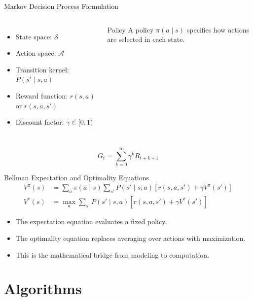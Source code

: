 \documentclass[aspectratio=169,11pt]{beamer}
\begin{document}
\begin{frame}{Markov Decision Process Formulation}
  \begin{columns}[T]
    \begin{itemize}
      \item State space: \(\mathcal{S}\)
      \item Action space: \(\mathcal{A}\)
      \item Transition kernel: \(P(s' \mid s,a)\)
      \item Reward function: \(r(s,a)\) or \(r(s,a,s')\)
      \item Discount factor: \(\gamma \in [0,1)\)
    \end{itemize}

    \begin{block}{Policy}
      A policy \(\pi(a \mid s)\) specifies how actions are selected in each state.
    \end{block}
  \end{columns}

  \vspace{0.2cm}
  \[
    G_t = \sum_{k=0}^{\infty} \gamma^k R_{t+k+1}
  \]
\end{frame}

\begin{frame}{Bellman Expectation and Optimality Equations}
  \begin{align*}
    V^{\pi}(s)
    &=
    \sum_{a} \pi(a \mid s)
    \sum_{s'} P(s' \mid s,a)
    \left[r(s,a,s') + \gamma V^{\pi}(s')\right] \\
    V^*(s)
    &=
    \max_{a}
    \sum_{s'} P(s' \mid s,a)
    \left[r(s,a,s') + \gamma V^*(s')\right]
  \end{align*}

  \begin{itemize}
    \item The expectation equation evaluates a fixed policy.
    \item The optimality equation replaces averaging over actions with maximization.
    \item This is the mathematical bridge from modeling to computation.
  \end{itemize}
\end{frame}

\section{Algorithms}
\end{document}
